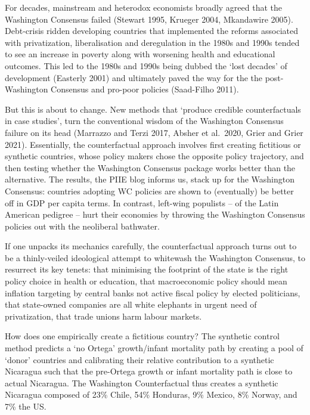 \documentclass[
]{book}
\begin{document}
For decades, mainstream and heterodox economists broadly agreed that the Washington Consensus failed (Stewart 1995, Krueger 2004, Mkandawire 2005). Debt-crisis ridden developing countries that implemented the reforms associated with privatization, liberalisation and deregulation in the 1980s and 1990s tended to see an increase in poverty along with worsening health and educational outcomes. This led to the 1980s and 1990s being dubbed the `lost decades' of development (Easterly 2001) and ultimately paved the way for the the post-Washington Consensus and pro-poor policies (Saad-Filho 2011).

But this is about to change. New methods that `produce credible counterfactuals in case studies', turn the conventional wisdom of the Washington Consensus failure on its head (Marrazzo and Terzi 2017, Absher et al.~2020, Grier and Grier 2021). Essentially, the counterfactual approach involves first creating fictitious or synthetic countries, whose policy makers chose the opposite policy trajectory, and then testing whether the Washington Consensus package works better than the alternative. The results, the PIIE blog informs us, stack up for the Washington Consensus: countries adopting WC policies are shown to (eventually) be better off in GDP per capita terms. In contrast, left-wing populists -- of the Latin American pedigree -- hurt their economies by throwing the Washington Consensus policies out with the neoliberal bathwater.

If one unpacks its mechanics carefully, the counterfactual approach turns out to be a thinly-veiled ideological attempt to whitewash the Washington Consensus, to resurrect its key tenets: that minimising the footprint of the state is the right policy choice in health or education, that macroeconomic policy should mean inflation targeting by central banks not active fiscal policy by elected politicians, that state-owned companies are all white elephants in urgent need of privatization, that trade unions harm labour markets.

How does one empirically create a fictitious country? The synthetic control method predicts a `no Ortega' growth/infant mortality path by creating a pool of `donor' countries and calibrating their relative contribution to a synthetic Nicaragua such that the pre-Ortega growth or infant mortality path is close to actual Nicaragua. The Washington Counterfactual thus creates a synthetic Nicaragua composed of 23\% Chile, 54\% Honduras, 9\% Mexico, 8\% Norway, and 7\% the US.
\end{document}
